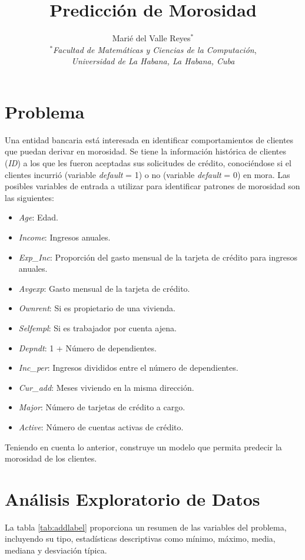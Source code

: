 \documentclass{article}
\title{\textbf{Predicci\'on de Morosidad}}
\author{Mari\'e del Valle Reyes$^{*}$ \\
        \small $^{*}$\textit{Facultad de Matem\'aticas y Ciencias de la Computaci\'on},\\ \small \textit{Universidad de La Habana, La Habana, Cuba} }
\date{}
\begin{document}
\maketitle


\section{Problema}
Una entidad bancaria está interesada en identificar comportamientos de clientes que puedan derivar en morosidad. Se tiene la información histórica de clientes (\textit{ID}) a
los que les fueron aceptadas sus solicitudes de crédito, conociéndose si el clientes incurrió
(variable \textit{default} = 1) o no (variable \textit{default} = 0) en mora. Las posibles variables de entrada a utilizar para identificar patrones de morosidad son las siguientes:

\begin{itemize}
    \item \textit{Age}: Edad.
    \item \textit{Income}: Ingresos anuales.
    \item \textit{Exp\_Inc}: Proporci\'on del gasto mensual de la tarjeta de cr\'edito para ingresos anuales.
    \item \textit{Avgexp}: Gasto mensual de la tarjeta de cr\'edito.
    \item \textit{Ownrent}: Si es propietario de una vivienda.
    \item \textit{Selfempl}: Si es trabajador por cuenta ajena.
    \item \textit{Depndt}: 1 + N\'umero de dependientes.
    \item \textit{Inc\_per}: Ingresos divididos entre el n\'umero de dependientes.
    \item \textit{Cur\_add}: Meses viviendo en la misma direcci\'on.
    \item \textit{Major}: N\'umero de tarjetas de cr\'edito a cargo.
    \item \textit{Active}: N\'umero de cuentas activas de cr\'edito.
\end{itemize}

Teniendo en cuenta lo anterior, construye un modelo que permita predecir la morosidad de los clientes.

\section{An\'alisis Exploratorio de Datos}

La tabla \ref{tab:addlabel} proporciona un resumen de las variables del problema, incluyendo su tipo, estadísticas descriptivas como mínimo, máximo, media, mediana y desviación típica. 
\end{document}

